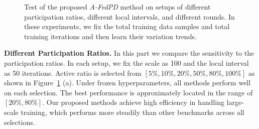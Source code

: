 \begin{figure}[t]
\vskip -0.05in
\centering
    \!\!\!
    \!\!\!
\vskip -0.1in
\caption{Test of the proposed \textit{A-FedPD} method on setups of different participation ratios, different local intervals, and different rounds. In these experiments, we fix the total training data samples and total training iterations and then learn their variation trends.}
\label{ablations}
\vskip -0.15in
\end{figure}

\textbf{Different Participation Ratios.} In this part we compare the sensitivity to the participation ratios. In each setup, we fix the scale as 100 and the local interval as 50 iterations. Active ratio is selected from $\left[5\%, 10\%, 20\%, 50\%, 80\%, 100\%\right]$ as shown in Figure~\ref{ablations} (a). Under frozen hyperparameters, all methods perform well on each selection. The best performance is approximately located in the range of $[20\%, 80\%]$. Our proposed methods achieve high efficiency in handling large-scale training, which performs more steadily than other benchmarks across all selections.

